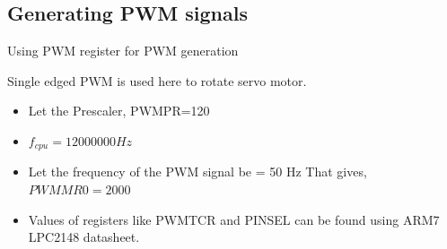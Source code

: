 \documentclass[table,10pt,red]{beamer}	%
\begin{document}
\subsection{Generating PWM signals}
\begin{frame}{Using PWM register for PWM generation}
	



	Single edged PWM is used here to rotate servo motor.
	\begin{itemize}
		\item
		Let the Prescaler, PWMPR=120


		\pause
		\item
	$	f_{cpu} = 12000000 Hz $
		\pause
		\item
		Let the frequency of the PWM signal be = 50 Hz
		\pause
		That gives,
		$PWMMR0 = 2000	$


		\pause
		\item
		Values of registers like PWMTCR and PINSEL can be found using ARM7 LPC2148 datasheet.

	\end{itemize}
\end{frame}
\end{document}
